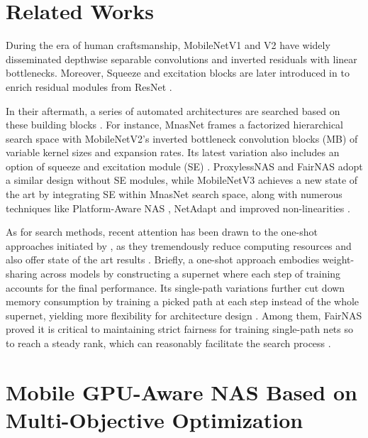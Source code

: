 \documentclass[letterpaper]{article} \usepackage{aaai20}  \usepackage{times}  \usepackage{helvet} \usepackage{courier}  \usepackage[hyphens]{url}  \usepackage{graphicx} \urlstyle{rm} \def\UrlFont{\rm}  \usepackage{graphicx}  \usepackage{amsmath}
\begin{document}
\section{Related Works} 
\label{sec:related}

During the era of human craftsmanship, MobileNetV1 and V2 \cite{howard2017mobilenets,sandler2018mobilenetv2} have widely disseminated depthwise separable convolutions and inverted residuals with linear bottlenecks. Moreover, Squeeze and excitation blocks are later introduced in \cite{hu2018squeeze} to enrich residual modules from ResNet \cite{he2016deep}.

In their aftermath, a series of automated architectures are searched based on these building blocks \cite{tan2018mnasnet,cai2018proxylessnas,chu2019fairnas,howard2019searching}. For instance, MnasNet frames a factorized hierarchical search space with MobileNetV2's inverted bottleneck convolution blocks (MB) of variable kernel sizes and expansion rates. Its latest variation also includes an option of squeeze and excitation module (SE)  \cite{tan2018mnasnet}. ProxylessNAS and FairNAS adopt a similar design \cite{cai2018proxylessnas,chu2019fairnas} without SE modules, while MobileNetV3 achieves a new state of the art by integrating SE within MnasNet search space, along with numerous techniques like Platform-Aware NAS \cite{tan2018mnasnet},  NetAdapt \cite{yang2018netadapt} and improved non-linearities \cite{howard2019searching}.

As for search methods, recent attention has been drawn to the one-shot approaches initiated by \cite{bender2018understanding}, as they tremendously reduce computing resources and also offer state of the art results \cite{cai2018proxylessnas,stamoulis2019single,guo2019single,chu2019fairnas}. Briefly, a one-shot approach embodies weight-sharing across models by constructing a supernet where each step of training accounts for the final performance. Its single-path variations further cut down memory consumption by training a picked path at each step instead of the whole supernet, yielding more flexibility for architecture design \cite{stamoulis2019single,guo2019single,chu2019fairnas}. Among them, FairNAS proved it is critical to maintaining strict fairness for training single-path nets so to reach a steady rank, which can reasonably facilitate the search process \cite{chu2019fairnas}. 


\section{Mobile GPU-Aware NAS Based on Multi-Objective Optimization}
\label{sec:gpu}
\end{document}
